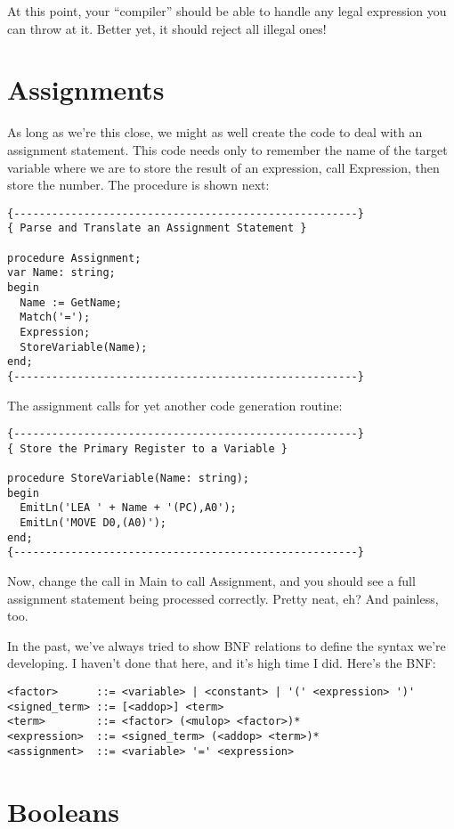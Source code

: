 At this point, your ``compiler'' should be able to handle any legal expression you can throw at it. Better yet, it should reject all illegal ones!

\section{Assignments}

As long as we're this close, we might as well create the code to deal with an assignment statement. This code needs only to remember the name of the target variable where we are to store the result of an expression, call Expression, then store the number. The procedure is shown next:

\begin{verbatim}
{------------------------------------------------------}
{ Parse and Translate an Assignment Statement }

procedure Assignment;
var Name: string;
begin
  Name := GetName;
  Match('=');
  Expression;
  StoreVariable(Name);
end;
{------------------------------------------------------}
\end{verbatim}

The assignment calls for yet another code generation routine:

\begin{verbatim}
{------------------------------------------------------}
{ Store the Primary Register to a Variable }

procedure StoreVariable(Name: string);
begin
  EmitLn('LEA ' + Name + '(PC),A0');
  EmitLn('MOVE D0,(A0)');
end;
{------------------------------------------------------}
\end{verbatim}

Now, change the call in Main to call Assignment, and you should see a full assignment statement being processed correctly. Pretty neat, eh?  And painless, too.

In the past, we've always tried to show BNF relations to define the syntax we're developing. I haven't done that here, and it's high time I did. Here's the BNF:

\begin{verbatim}
<factor>      ::= <variable> | <constant> | '(' <expression> ')'
<signed_term> ::= [<addop>] <term>
<term>        ::= <factor> (<mulop> <factor>)*
<expression>  ::= <signed_term> (<addop> <term>)*
<assignment>  ::= <variable> '=' <expression>
\end{verbatim}

\section{Booleans}

